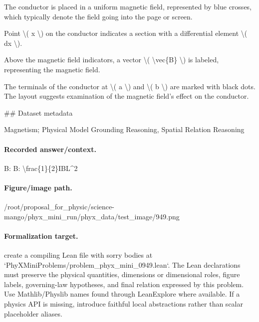 The conductor is placed in a uniform magnetic field, represented by blue crosses, which typically denote the field going into the page or screen. 

Point \textbackslash{}( x \textbackslash{}) on the conductor indicates a section with a differential element \textbackslash{}( dx \textbackslash{}). 

Above the magnetic field indicators, a vector \textbackslash{}( \textbackslash{}vec\{B\} \textbackslash{}) is labeled, representing the magnetic field.

The terminals of the conductor at \textbackslash{}( a \textbackslash{}) and \textbackslash{}( b \textbackslash{}) are marked with black dots. The layout suggests examination of the magnetic field's effect on the conductor.

\#\# Dataset metadata

Magnetism; Physical Model Grounding Reasoning, Spatial Relation Reasoning

\paragraph{Recorded answer/context.}
B: B: \textbackslash{}frac\{1\}\{2\}IBL\textasciicircum{}2

\paragraph{Figure/image path.}
/root/proposal\_for\_physic/science-mango/phyx\_mini\_run/phyx\_data/test\_image/949.png

\paragraph{Formalization target.}
create a compiling Lean file with sorry bodies at `PhyXMiniProblems/problem\_phyx\_mini\_0949.lean`. The Lean declarations must preserve the physical quantities, dimensions or dimensional roles, figure labels, governing-law hypotheses, and final relation expressed by this problem.
Use Mathlib/Physlib names found through LeanExplore where available. If a physics API is missing, introduce faithful local abstractions rather than scalar placeholder aliases.


